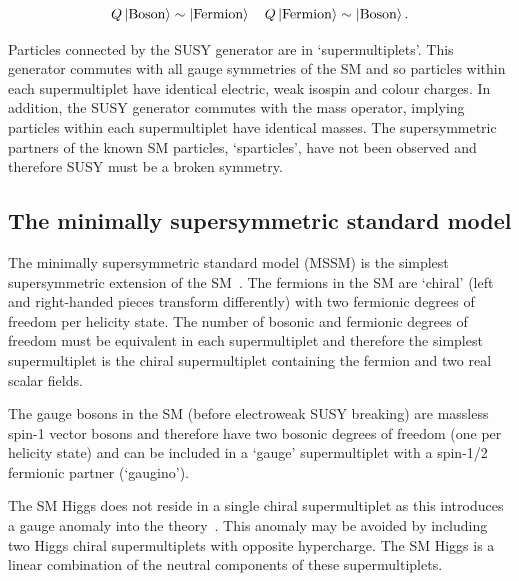\begin{equation}
Q\ket{\text{Boson}} \sim \ket{\text{Fermion}} \quad Q\ket{\text{Fermion}} \sim \ket{\text{Boson}}.
\end{equation}

Particles connected by the SUSY generator are in `supermultiplets'. This generator commutes with all gauge symmetries 
of the SM and so particles within each supermultiplet have identical electric, weak isospin and colour charges.
In addition, the SUSY generator commutes with the mass operator, implying 
particles within each supermultiplet have identical masses. The supersymmetric partners of the 
known SM particles, `sparticles', have not been observed and therefore SUSY must be a broken symmetry.

\subsection{The minimally supersymmetric standard model}

The minimally supersymmetric standard model (MSSM) is the simplest supersymmetric extension of the SM~\cite{SUSYP}.
The fermions in the SM are `chiral' (left and right-handed pieces transform differently)
with two fermionic degrees of freedom per helicity state. The number of bosonic and fermionic degrees 
of freedom must be equivalent in each supermultiplet and therefore the simplest supermultiplet
is the chiral supermultiplet containing the fermion and two real scalar fields.

The gauge bosons in the SM (before electroweak SUSY breaking) are massless spin-1 vector bosons
and therefore have two bosonic degrees of freedom (one per helicity state) and
can be included in a `gauge' supermultiplet with a spin-1/2 fermionic partner (`gaugino').

The SM Higgs does not reside in a single chiral supermultiplet as this introduces
a gauge anomaly into the theory~\cite{SUSYP}. This anomaly may be avoided by including two Higgs 
chiral supermultiplets with opposite hypercharge. The SM Higgs is a linear combination of the neutral components 
of these supermultiplets.

